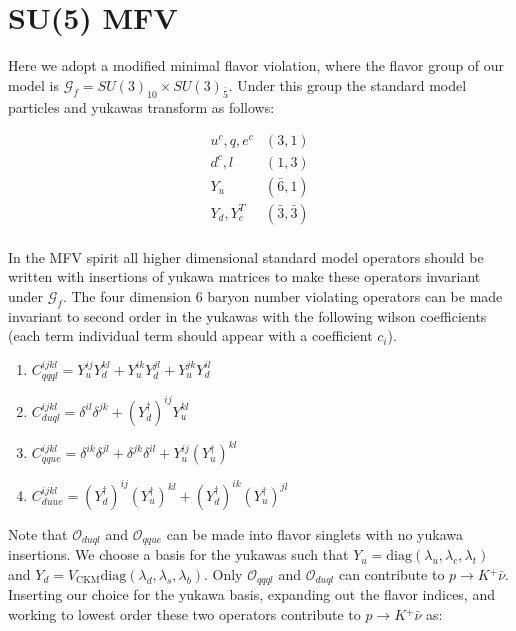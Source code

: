 \documentclass[aps,onecolumn,twoside,secnumarabic,balancelastpage,amsmath,amssymb,nofootinbib,hyperref=pdftex]{revtex4}
\begin{document}
\title{}
\author         {Noah Steinberg}
\date{\today}

\maketitle

\section{SU(5) MFV}

Here we adopt a modified minimal flavor violation, where the flavor group of our model is $\mathcal{G}_{f} = SU(3)_{10} \times SU(3)_{\bar{5}}$. Under this group the standard model particles and yukawas transform as follows:

\begin{align}
u^{c},q,e^{c}&(3,1)\\
d^{c},l&(1,3)\\
Y_{u}&(\bar{6},1)\\
Y_{d},Y^{T}_{e}&(\bar{3},\bar{3})\\
\end{align}

In the MFV spirit all higher dimensional standard model operators should be written with insertions of yukawa matrices to make these operators invariant under $\mathcal{G}_{f}$. The four dimension 6 baryon number violating operators can be made invariant to second order in the yukawas with the following wilson coefficients (each term individual term should appear with a coefficient $c_{i}$).

\begin{enumerate}
\item $C^{ijkl}_{qqql} = Y^{ij}_{u}Y^{kl}_{d} + Y^{ik}_{u}Y^{jl}_{d} + Y^{jk}_{u}Y^{il}_{d}$
\item $C^{ijkl}_{duql} = \delta^{il}\delta^{jk} + (Y^{\dagger}_{d})^{ij}Y^{kl}_{u}$
\item $C^{ijkl}_{qque} = \delta^{ik}\delta^{jl} + \delta^{jk}\delta^{il} + Y^{ij}_{u}(Y^{\dagger}_{u})^{kl}$
\item $C^{ijkl}_{duue} = (Y^{\dagger}_{d})^{ij}(Y^{\dagger}_{u})^{kl} + (Y^{\dagger}_{d})^{ik}(Y^{\dagger}_{u})^{jl}$
\end{enumerate}

Note that $\mathcal{O}_{duql}$ and $\mathcal{O}_{qque}$ can be made into flavor singlets with no yukawa insertions. We choose a basis for the yukawas such that $Y_{u} = \text{diag}(\lambda_{u}, \lambda_{c}, \lambda_{t})$ and $Y_{d} = V_{\text{CKM}}\text{diag}(\lambda_{d}, \lambda_{s}, \lambda_{b})$. Only $\mathcal{O}_{qqql}$ and $\mathcal{O}_{duql}$ can contribute to $p\rightarrow K{^+}\bar{\nu}$. Inserting our choice for the yukawa basis, expanding out the flavor indices, and working to lowest order these two operators contribute to $p\rightarrow K{^+}\bar{\nu}$ as:
\end{document}
